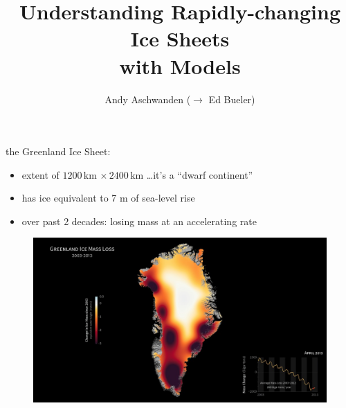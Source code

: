 \documentclass[hide notes,intlimits]{beamer}
\title[] %
{Understanding Rapidly-changing Ice Sheets \\ with Models}
\author[Aschwanden, Fahnestock, Truffer] %
{Andy Aschwanden ($\to$ Ed Bueler)}
\institute[Geophysical Institute] %
{}
\date{}
\begin{document}


  {
} 


\begin{frame}
  \titlepage
\end{frame}

  {
} 


\begin{frame}[plain]

\phantom{foo}

the Greenland Ice Sheet:

    \begin{itemize}
    \item extent of $1200\,\text{km}\,\times 2400\,\text{km}$ \dots it's a ``dwarf continent''
    \item has ice equivalent to 7 m of sea-level rise
    \item over past 2 decades: losing mass at an accelerating rate
    \end{itemize}
    \begin{figure}
      \includegraphics[width=12cm]{grace_greenland_2004_2012_still_print} \\
  \end{figure}
\end{frame}
\end{document}
